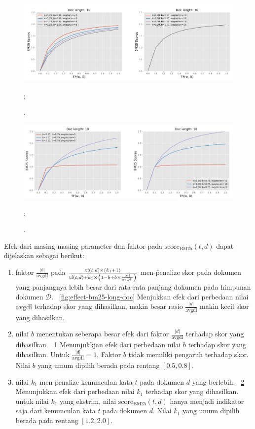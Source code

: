     \begin{figure}
        \centering
        \includegraphics[width=1\textwidth]{assets/pics/effect-bm25-param-b.png}
        \caption{\license.};
        \label{fig:effect-bm25-param-b}
    \end{figure}
    \begin{figure}
        \centering
        \includegraphics[width=1\textwidth]{assets/pics/effect-bm25-param-k.png}
        \caption{\license.};
        \label{fig:effect-bm25-param-k}
    \end{figure}

    Efek dari masing-masing parameter dan faktor pada $\text{score}_{\text{BM25}}(t,d)$ dapat dijelaskan sebagai berikut:
    \begin{enumerate}
        \item faktor $\frac{|\text{d}|}{\text{avgdl}}$ pada $\frac{\text{tf}(t, d) \times (k_1 + 1)}{\text{tf}(t, d) + k_1 \times \left(1 - b + b \times \textcolor{black}{\frac{|d|}{\text{avgdl}}}\right)}$ men-\f{penalize} skor pada dokumen yang panjangnya lebih besar dari rata-rata panjang dokumen pada himpunan dokumen $\mathcal{D}$. \pic~\ref{fig:effect-bm25-long-doc} Menjukkan efek dari perbedaan nilai $\text{avgdl}$ terhadap skor yang dihasilkan, makin besar rasio $\frac{|d|}{\text{avgdl}}$ makin kecil skor yang dihasilkan.
        \item nilai $b$ menentukan seberapa besar efek dari faktor $\frac{|d|}{\text{avgdl}}$ terhadap skor yang dihasilkan. \pic~\ref{fig:effect-bm25-param-b} Menunjukkjan efek dari perbedaan nilai $b$ terhadap skor yang dihasilkan. Untuk $\frac{|d|}{\text{avgdl}}=1$, Faktor $b$ tidak memiliki pengaruh terhadap skor. Nilai $b$ yang umum dipilih berada pada rentang $[0.5, 0.8]$.
        \item  nilai $k_1$ men-\f{penalize} kemunculan kata $t$ pada dokumen $d$ yang berlebih. \pic~\ref{fig:effect-bm25-param-k} Menunjukkan efek dari perbedaan nilai $k_1$ terhadap skor yang dihasilkan. untuk nilai $k_1$ yang ekstrim, nilai $\text{score}_{\text{BM25}}(t,d)$ hanya menjadi indikator saja dari kemunculan kata $t$ pada dokumen $d$. Nilai $k_1$ yang umum dipilih berada pada rentang $[1.2, 2.0]$.
    \end{enumerate}

